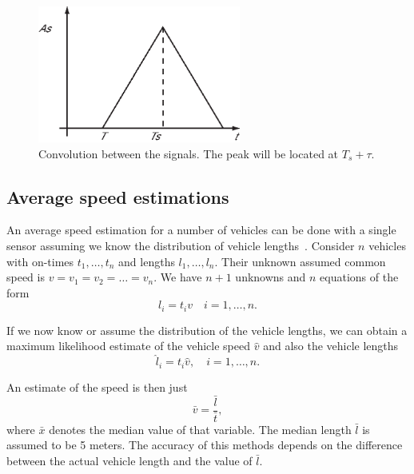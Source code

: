 \begin{subfigures}
\begin{figure}[!htbf]
\begin{minipage}{0.45\linewidth}
  \centering
   \includegraphics[height=4.5cm]{images/conv3}
  \caption[Synchronisation time]{Convolution between the signals. The peak will be located at $T_s + \tau$.}
  \label{fig-conv3}
  \end{minipage}
 \end{figure}
\end{subfigures}

\subsection{Average speed estimations}\label{sec:avg}

An average speed estimation for a number of vehicles can be done with a single sensor assuming we know the distribution of vehicle lengths~\cite{cheung2005-2}. Consider $n$ vehicles with on-times $t_1, \ldots, t_n$ and lengths $l_1, \dots, l_n$. Their unknown assumed common speed is $v = v_1 = v_2 = \ldots = v_n$. We have $n+1$ unknowns and $n$ equations of the form
\begin{equation}
	l_i = t_i v \quad i=1, \dots, n. %
\end{equation}

If we now know or assume the distribution of the vehicle lengths, we can obtain a maximum likelihood estimate of the vehicle speed $\hat{v}$ and also the vehicle lengths
\begin{equation}
 \hat{l}_i = {t_i}{\hat{v}}, \quad i=1, \dots, n. %
 \label{eq:hatl}
\end{equation}

An estimate of the speed is then just
\begin{equation}
 \bar{v} = \frac{\bar{l}}{\bar{t}},
\end{equation}
where $\bar{x}$ denotes the median value of that variable. The median length $\bar{l}$ is assumed to be 5 meters. The accuracy of this methods depends on the difference between the actual vehicle length and the value of $\bar{l}$.

